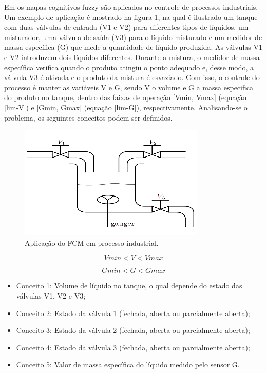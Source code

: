 Em \cite{FCMENDONCA} os mapas cognitivos fuzzy são aplicados no controle de processos industriais. Um exemplo de aplicação é mostrado na figura \ref{fig:fcm-exemplo-planta}, na qual é ilustrado um tanque com duas válvulas de entrada (V1 e V2) para diferentes tipos de líquidos, um misturador, uma válvula de saída (V3) para o líquido misturado e um medidor de massa específica (G) que mede a quantidade de líquido produzida. As válvulas V1 e V2 introduzem dois líquidos diferentes. Durante a mistura, o medidor de massa específica verifica quando o produto atingiu o ponto adequado e, desse modo, a válvula V3 é ativada e o produto da mistura é esvaziado. Com isso, o controle do processo é manter as variáveis V e G, sendo V o volume e G a massa especifica do produto no tanque, dentro das faixas de operação [Vmin, Vmax] (equação \ref{lim-V}) e [Gmin, Gmax] (equação \ref{lim-G}), respectivamente. Analisando-se o problema, os seguintes conceitos podem ser definidos.

\begin{figure}[!htb]
    \centering
    \includegraphics{./figs/fcm-exemplo-planta.png}
    \caption[Mapa Cognitivo Fuzzy]{Aplicação do FCM em processo industrial.}
    \label{fig:fcm-exemplo-planta}
\end{figure}

\begin{equation}\label{lim-V}
Vmin<V<Vmax
\end{equation}

\begin{equation}\label{lim-G}
Gmin<G<Gmax
\end{equation}

\begin{itemize}
\item Conceito 1: Volume de líquido no tanque, o qual depende do estado das válvulas V1, V2 e V3;
\item Conceito 2: Estado da válvula 1 (fechada, aberta ou parcialmente aberta);
\item Conceito 3: Estado da válvula 2 (fechada, aberta ou parcialmente aberta);
\item Conceito 4: Estado da válvula 3 (fechada, aberta ou parcialmente aberta);
\item Conceito 5: Valor de massa específica do líquido medido pelo sensor G.
\end{itemize}

